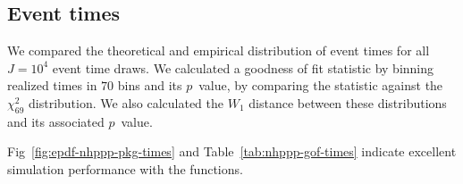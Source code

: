 \documentclass[article,nojss]{jss}\usepackage[]{graphicx}\usepackage[]{xcolor}
\begin{document}
\subsection{Event times}\label{sec:example-event-times}

We compared the theoretical and empirical distribution of event times for all $J=\ensuremath{10^{4}}$ event time draws. We calculated a goodness of fit statistic by binning realized times in $70$ bins and its $p$~value, by comparing the statistic against the $\chi^2_{69}$ distribution. We also calculated the $W_1$ distance between these distributions and its associated $p$~value.

Fig~\ref{fig:epdf-nhppp-pkg-times} and Table~\ref{tab:nhppp-gof-times} indicate excellent simulation performance with the  functions.


\begin{table}[ht!]
\centering
\caption{\textbf{Goodness of fit of simulated event times with  functions for the example.}} 
\vspace{5pt}
\label{tab:nhppp-gof-times}
\end{table}
\end{document}
